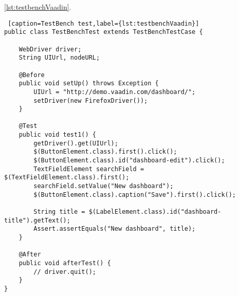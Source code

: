 	
	\ref{lst:testbenchVaadin}.
	\lstset{style=a1listing}
  	\begin{lstlisting} [caption=TestBench test,label={lst:testbenchVaadin}]
public class TestBenchTest extends TestBenchTestCase {

    WebDriver driver;
    String UIUrl, nodeURL;

    @Before
    public void setUp() throws Exception {
        UIUrl = "http://demo.vaadin.com/dashboard/";
        setDriver(new FirefoxDriver());
    }

    @Test
    public void test1() {
        getDriver().get(UIUrl);
        $(ButtonElement.class).first().click();
        $(ButtonElement.class).id("dashboard-edit").click();
        TextFieldElement searchField = $(TextFieldElement.class).first();
        searchField.setValue("New dashboard");
        $(ButtonElement.class).caption("Save").first().click();

        String title = $(LabelElement.class).id("dashboard-title").getText();
        Assert.assertEquals("New dashboard", title);
    }

    @After
    public void afterTest() {
        // driver.quit();
    }
}  	
\end{lstlisting}